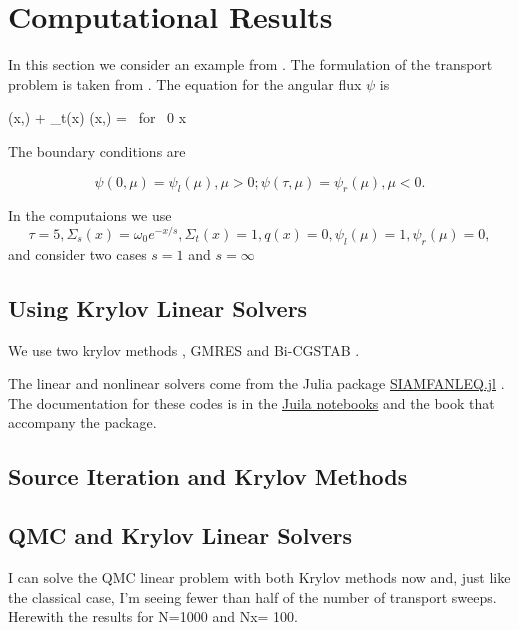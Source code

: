 \section{Computational Results}
\label{sec:results}
In this section we consider an example from
\cite{cesinh}. The formulation of the transport
problem is taken from \cite{ctk:jeff1}. The equation for the angular
flux \(\psi\) is

\begeq
\label{eq:transportgs}
\mu {} (x,\mu) + \Sigma_t(x) \psi(x,\mu) =
 
 \mbox{ for } 0 \le x \le \tau
\endeq

The boundary conditions are

\[
\psi(0, \mu) = \psi_l(\mu), \mu > 0; \psi(\tau, \mu) = \psi_r(\mu),
\mu < 0.
\]

In the computaions we use
\[
\tau=5, \Sigma_s(x) =\omega_0 e^{-x/s},  \Sigma_t(x) = 1, q(x) = 0, \psi_l(\mu) = 1, \psi_r(\mu) = 0,
\]
and consider two cases $s=1$ and $s=\infty$ 

\subsection{Using Krylov Linear Solvers}
\label{subsec:krylov}

We use two krylov methods \cite{ctk:roots}, GMRES \cite{gmres} and
Bi-CGSTAB \cite{bicgstab}.

The linear and nonlinear solvers come from the Julia package
\href{https://github.com/ctkelley/SIAMFANLEquations.jl}{SIAMFANLEQ.jl}
\cite{ctk:siamfanl}. The documentation for these codes is in the
\href{https://github.com/ctkelley/NotebookSIAMFANL}{Juila notebooks}
\cite{ctk:notebooknl} and the book \cite{ctk:fajulia}
that accompany the package. 

\subsection{Source Iteration and Krylov Methods}


\subsection{QMC and Krylov Linear Solvers}
\label{qmc-and-krylov-linear-solvers}

I can solve the QMC linear problem with both Krylov methods now and,
just like the classical case, I'm seeing fewer than half of the number
of transport sweeps. Herewith the results for N=1000 and Nx= 100.

